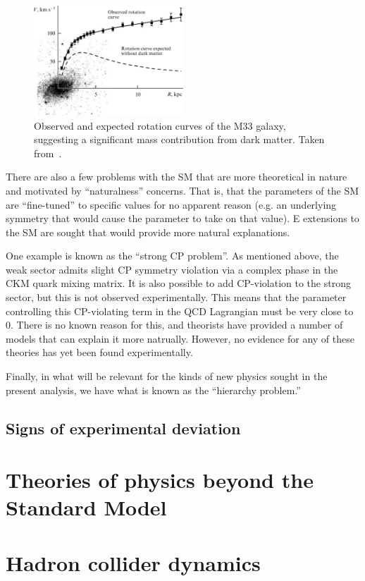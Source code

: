 \begin{figure}[t]
  \centering
  \includegraphics[width=0.5\textwidth]{figs/theory/dm.jpg}
  \caption{Observed and expected rotation curves of the M33 galaxy, suggesting
    a significant mass contribution from dark matter. Taken from~\cite{Zasov:dm}.
            }
    \label{fig:dm_curve}
\end{figure}

There are also a few problems with the SM that are more theoretical in nature and motivated by ``naturalness'' concerns.
That is, that the parameters of the SM are ``fine-tuned'' to specific values for no apparent reason (e.g. an underlying symmetry
that would cause the parameter to take on that value). E extensions to the SM are sought that would provide more 
natural explanations.

One example is known as the ``strong CP problem''. As mentioned above, the weak sector admits slight CP symmetry violation
via a complex phase in the CKM quark mixing matrix. It is also possible to add CP-violation to the strong sector, but this
is not observed experimentally. This means that the parameter controlling this CP-violating term in the QCD Lagrangian
must be very close to 0. There is no known reason for this, and theorists have provided a number of models that can explain
it more natrually. However, no evidence for any of these theories has yet been found experimentally.

Finally, in what will be relevant for the kinds of new physics sought in the present analysis, we have what is known as the
``hierarchy problem.''

\subsection{Signs of experimental deviation}

\section{Theories of physics beyond the Standard Model}
\label{sec:bsm}

\section{Hadron collider dynamics}
\label{sec:bsm}
